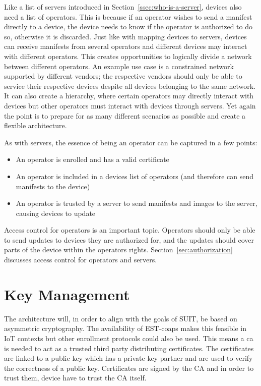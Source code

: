 \documentclass[0-thesis.tex]{subfiles}
\begin{document}
Like a list of servers introduced in Section~\ref{ssec:who-is-a-server}, devices also need
a list of operators. This is because if an operator wishes to send a manifest directly to
a device, the device needs to know if the operator is authorized to do so, otherwise it is
discarded. Just like with mapping devices to servers, devices can receive manifests from
several operators and different devices may interact with different operators. This
creates opportunities to logically divide a network between different operators. An
example use case is a constrained network supported by different vendors; the respective
vendors should only be able to service their respective devices despite all devices
belonging to the same network. It can also create a hierarchy, where certain operators may
directly interact with devices but other operators must interact with devices through
servers. Yet again the point is to prepare for as many different scenarios as possible and
create a flexible architecture.

As with servers, the essence of being an operator can be captured in a few points:

\begin{itemize}
    \item An operator is enrolled and has a valid certificate
    \item An operator is included in a devices list of operators (and therefore can send
            manifests to the device)
    \item An operator is trusted by a server to send manifests and images to the server,
            causing devices to update
\end{itemize}

Access control for operators is an important topic. Operators should only be able to send
updates to devices they are authorized for, and the updates should cover parts of the
device within the operators rights. Section~\ref{sec:authorization} discusses access
control for operators and servers.


\section{Key Management}
\label{sec:key-management}
The architecture will, in order to align with the goals of SUIT, be based on asymmetric
cryptography. The availability of EST-coaps makes this feasible in IoT contexts but other
enrollment protocols could also be used. This means a \gls{ca} is needed to act as a
trusted third party distributing certificates. The certificates are linked to a public key
which has a private key partner and are used to verify the correctness of a public key.
Certificates are signed by the CA and in order to trust them, device have to trust the CA
itself.
\end{document}
